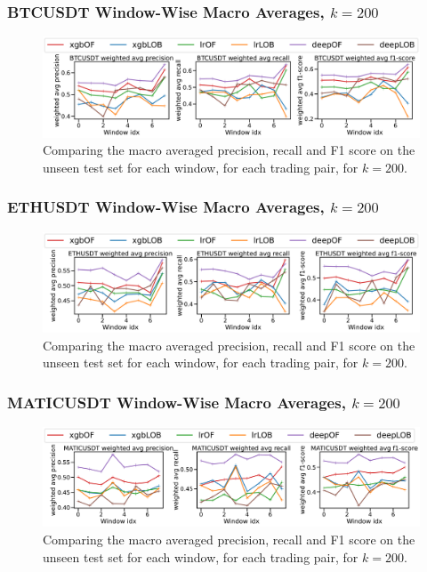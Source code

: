 \documentclass[handout]{beamer}
\begin{document}
\begin{frame}
    \frametitle{BTCUSDT Window-Wise Macro Averages, $k=200$}
    \begin{figure}[htpb!]
        \centering
        \includegraphics[width=1.0\textwidth]{./images/BTCUSDT_macro_results_k=200.pdf}
        \caption{Comparing the macro averaged precision, recall and F1 score on the unseen test set for each window, for each trading pair, for $k=200$.}
        
    \end{figure}
\end{frame}

\begin{frame}
    \frametitle{ETHUSDT Window-Wise Macro Averages, $k=200$}
    \begin{figure}[htpb!]
        \centering
        \includegraphics[width=1.0\textwidth]{./images/ETHUSDT_macro_results_k=200.pdf}
        \caption{Comparing the macro averaged precision, recall and F1 score on the unseen test set for each window, for each trading pair, for $k=200$.}
        
    \end{figure}
\end{frame}

\begin{frame}
    \frametitle{MATICUSDT Window-Wise Macro Averages, $k=200$}
    \begin{figure}[htpb!]
        \centering
        \includegraphics[width=1.0\textwidth]{./images/MATICUSDT_macro_results_k=200.pdf}
        \caption{Comparing the macro averaged precision, recall and F1 score on the unseen test set for each window, for each trading pair, for $k=200$.}
        
    \end{figure}
\end{frame}
\end{document}
